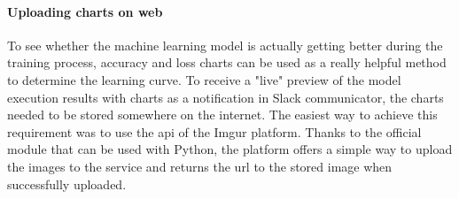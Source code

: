 \paragraph{Uploading charts on web}\label{para:charts-web-uploading}
To see whether the machine learning model is actually getting better during the training process, accuracy and loss charts can be used as a really helpful method to determine the learning curve.
To receive a "live" preview of the model execution results with charts as a notification in Slack communicator, the charts needed to be stored somewhere on the internet.
The easiest way to achieve this requirement was to use the \gls{api} of the Imgur platform.
Thanks to the official module that can be used with Python, the platform offers a simple way to upload the images to the service and returns the \gls{url} to the stored image when successfully uploaded.
